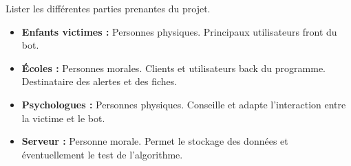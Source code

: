 \documentclass{article}
\begin{document}
Lister les différentes parties prenantes du projet. 

\begin{itemize}
\item \textbf{Enfants victimes :} Personnes physiques. Principaux utilisateurs front du bot. 
\item \textbf{Écoles :} Personnes morales. Clients et utilisateurs back du programme. Destinataire des alertes et des fiches.
\item \textbf{Psychologues :} Personnes physiques. Conseille et adapte l'interaction entre la victime et le bot.
\item \textbf{Serveur :} Personne morale. Permet le stockage des données et éventuellement le test de l'algorithme.   
\end{itemize}
\end{document}
